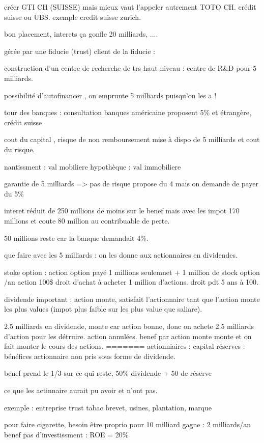\documentclass[a4paper,12pt]{article}
\begin{document}
créer GTI CH (SUISSE) mais mieux vaut l'appeler autrement TOTO CH. crédit suisse ou UBS.
exemple credit suisse zurich.

bon placement, interets ça gonfle 20 milliards, ....

gérée par une fiducie (trust)
client de la fiducie : 

construction d'un centre de recherche de trs haut niveau : centre de R\&D pour 5 milliards.

possibilité d'autofinancer , on emprunte 5 milliards puisqu'on les a !

tour des banques : consultation banques américaine proposent 5\% et étrangère, crédit suisse 

cout du capital  , risque de non remboursement  mise à dispo de 5 milliards et cout du risque.

nantissment : val mobiliere 
hypothèque : val immobiliere

garantie de 5 milliards => pas de risque
propose du 4 mais on demande de payer du  5\%

interet réduit de 250 millions de moins sur le benef
mais avec les impot 170 millions et coute 80 million au contribuable de perte.

50 millions reste car la banque demandait 4\%.

que faire avec les 5 milliards : on les donne aux actionnaires en dividendes. 

stoke option : action option payé 1 millions seulemnet + 1 million de stock option /an
action 100\$  droit d'achat à acheter 1 million d'actions. droit pdt 5 ans à 100.

dividende important : action monte, satisfait l'actionnaire
tant que l'action monte les plus values (impot plus faible sur les plus value que saliare).

2.5 milliards en dividende, monte car action bonne, donc on achete 2.5 milliards d'action pour les détruire.
action annulées. benef par action monte monte et on fait monter le cours des actions.
=======
actionniaires : capital
réserves : bénéfices actionnaire non pris sous forme de dividende.

benef prend le 1/3 sur ce qui reste, 50\% dividende + 50 de réserve

ce que les actinnaire aurait pu avoir et n'ont pas.

exemple : entreprise trust tabac
brevet, usines, plantation, marque

pour faire cigarette, besoin être proprio pour 10 milliard
gagne : 2 milliards/an benef
pas d'investissment : ROE = 20\%
\end{document}
